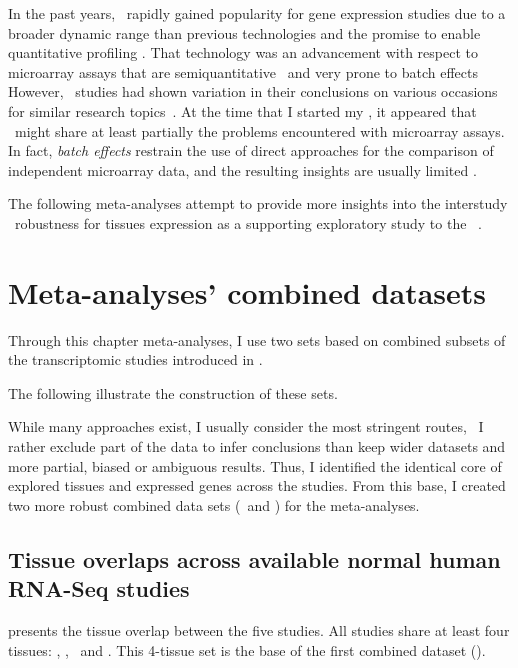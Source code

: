 In the past years,
\Rnaseq\ rapidly gained popularity
for gene expression studies
due to a broader dynamic range than previous technologies
and the promise to enable quantitative profiling .
That technology was an advancement with respect to microarray assays
that are semiquantitative~
and very prone to batch effects~
However, \Rnaseq\ studies had shown variation in their conclusions on various
occasions for similar research topics~.
At the time that I started my \phd,
it appeared that
\Rnaseq\ might share at least partially the problems encountered
with microarray assays.
In fact, \emph{batch effects} restrain the use of direct approaches
for the comparison of independent microarray data,
and the resulting insights are usually limited .\mybr\
\vspace{-1mm}

The following meta-analyses attempt to provide more insights
into the interstudy \Rnaseq\ robustness for tissues expression
as a supporting exploratory study to the \egxa{}~.

\section{Meta-analyses' combined datasets}
\vspace{-2mm}
Through this chapter meta-analyses, I use two sets
based on combined subsets of the transcriptomic studies introduced
in \Cref{ch:datasets}.

The following 
illustrate the construction of these sets.\mybr\

While many approaches exist,
I usually consider the most stringent routes,
\ie\ I rather exclude part of the data to infer conclusions than
keep wider datasets and more partial, biased or ambiguous results.
Thus, I identified the identical core of
explored tissues and expressed genes across the studies.
From this base, I created two more robust combined data sets
(\setOne\ and \setTwo) for the meta-analyses.\mybr\

\subsection{Tissue overlaps across available normal human RNA-Seq studies \quad}%
\label{subsec:transtissueOverlap}
\vspace{-7mm}
 presents the tissue overlap between the five studies.
All studies share at least four tissues:
\heart, \kidney, \liver\ and \testis.
This 4-tissue set is the base of the first combined dataset (\setOne).\mybr\

